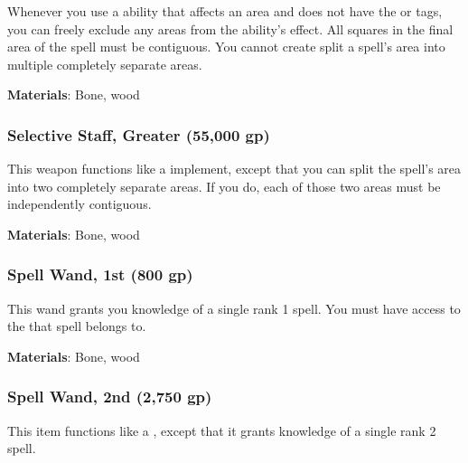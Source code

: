Whenever you use a  ability that affects an area and does not have the  or  tags, you can freely exclude any areas from the ability's effect.
All squares in the final area of the spell must be contiguous.
You cannot create split a spell's area into multiple completely separate areas.



\vspace{0.25em}
\textbf{Materials}: Bone, wood


\lowercase{\hypertarget{item:Selective Staff, Greater}{}}\label{item:Selective Staff, Greater}
\hypertarget{item:Selective Staff, Greater}{\subsubsection{Selective Staff, Greater\hfill{} (55,000 gp)}}

This weapon functions like a  implement, except that you can split the spell's area into two completely separate areas.
If you do, each of those two areas must be independently contiguous.



\vspace{0.25em}
\textbf{Materials}: Bone, wood


\lowercase{\hypertarget{item:Spell Wand, 1st}{}}\label{item:Spell Wand, 1st}
\hypertarget{item:Spell Wand, 1st}{\subsubsection{Spell Wand, 1st\hfill{} (800 gp)}}

This wand grants you knowledge of a single rank 1 spell.
You must have access to the  that spell belongs to.



\vspace{0.25em}
\textbf{Materials}: Bone, wood


\lowercase{\hypertarget{item:Spell Wand, 2nd}{}}\label{item:Spell Wand, 2nd}
\hypertarget{item:Spell Wand, 2nd}{\subsubsection{Spell Wand, 2nd\hfill{} (2,750 gp)}}

This item functions like a , except that it grants knowledge of a single rank 2 spell.



